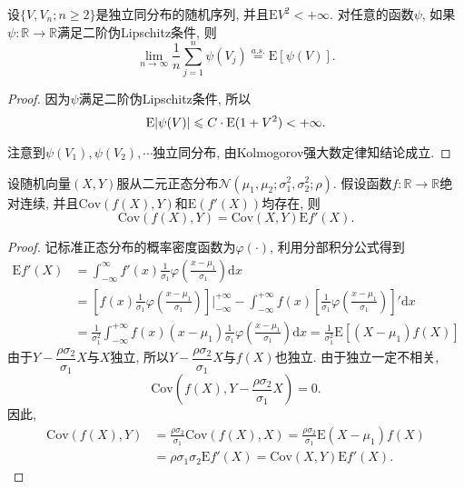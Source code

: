 \documentclass[12pt]{article}
\begin{document}
	\begin{Lemma}
	    设$\{V,V_n;n\geqslant 2\}$是独立同分布的随机序列, 并且$\mathrm{E}V^2<+\infty$. 对任意的函数$\psi$, 如果$\psi:\mathbb{R}\to\mathbb{R}$满足二阶伪Lipschitz条件, 则
	    \begin{equation}
	        \lim_{n\to\infty}\frac{1}{n}\sum_{j = 1}^n\psi(V_j) \stackrel{a.s.}{=} \mathrm{E}\left[\psi(V) \right].
	    \end{equation}
	\end{Lemma}
	\begin{proof}
	    因为$\psi$满足二阶伪Lipschitz条件, 所以$$
	        \mathrm{E} \abs{\psi(V)} \leqslant C\cdot\mathrm{E} (1+V^2) < +\infty.
	    $$
	
	    注意到$\psi(V_1),\psi(V_2),\cdots$独立同分布, 由Kolmogorov强大数定律知结论成立.
	\end{proof}
	
	
	\begin{Lemma}[Stein]
			设随机向量$(X, Y)$服从二元正态分布$\mathcal{N}(\mu_1,\mu_2;\sigma_1^2,\sigma_2^2;\rho)$. 假设函数$f:\mathbb{R}\to\mathbb{R}$绝对连续, 并且$\mathrm{Cov}(f(X),Y)$和$\mathrm{E}(f'(X))$均存在, 则
	    \begin{equation}
	    	\mathrm{Cov}(f(X),Y) = \mathrm{Cov}(X,Y) \mathrm{E}f'(X).
	    \end{equation}
	\end{Lemma}
	\begin{proof}
		记标准正态分布的概率密度函数为$\varphi(\cdot)$, 利用分部积分公式得到
		\begin{align*}
			\mathrm{E}f'(X) &= \int_{-\infty}^{\infty}f'(x)\frac{1}{\sigma_1}\varphi(\frac{x-\mu_1}{\sigma_1})\mathrm{d}x\\
			&=\left[ f(x)\frac{1}{\sigma_1}\varphi(\frac{x-\mu_1}{\sigma_1}) \right]\bigg\vert_{-\infty}^{+\infty} - \int_{-\infty}^{+\infty}f(x) \left[\frac{1}{\sigma_1}\varphi(\frac{x-\mu_1}{\sigma_1})\right]'\mathrm{d}x\\
			&= \frac{1}{\sigma_1^2}\int_{-\infty}^{+\infty}f(x)  (x-\mu_1)\frac{1}{\sigma_1}\varphi(\frac{x-\mu_1}{\sigma_1})\mathrm{d}x = \frac{1}{\sigma_1^2}\mathrm{E}\left[ (X-\mu_1)f(X) \right]
		\end{align*}
	  由于$Y - \dfrac{\rho\sigma_2}{\sigma_1} X$与$X$独立, 所以$Y - \dfrac{\rho\sigma_2}{\sigma_1} X$与$f(X)$也独立. 由于独立一定不相关,
	  \begin{equation*}
		  \mathrm{Cov}\left( f(X), Y - \frac{\rho\sigma_2}{\sigma_1} X \right) = 0.
	  \end{equation*}
		因此, \begin{align*}
			\mathrm{Cov}(f(X),Y) &=\frac{\rho\sigma_2}{\sigma_1}\mathrm{Cov}\left(f(X), X\right)=\frac{\rho\sigma_2}{\sigma_1} \mathrm{E}(X-\mu_1)f(X)\\
			&= \rho\sigma_1\sigma_2 \mathrm{E}f'(X)=\mathrm{Cov}(X,Y) \mathrm{E}f'(X).
		\end{align*}
	\end{proof}
	
\end{document}

